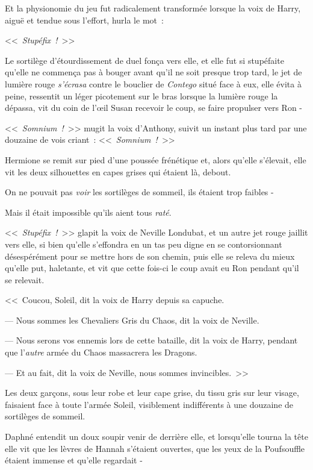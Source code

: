 Et la physionomie du jeu fut radicalement transformée lorsque la voix de Harry, aiguë et tendue sous l'effort, hurla le mot~:

<<~\emph{Stupéfix~!}~>>

Le sortilège d'étourdissement de duel fonça vers elle, et elle fut si stupéfaite qu'elle ne commença pas à bouger avant qu'il ne soit presque trop tard, le jet de lumière rouge \emph{s'écrasa} contre le bouclier de \emph{Contego} situé face à eux, elle évita à peine, ressentit un léger picotement sur le bras lorsque la lumière rouge la dépassa, vit du coin de l'œil Susan recevoir le coup, se faire propulser vers Ron -

<<~\emph{Somnium~!}~>> mugit la voix d'Anthony, suivit un instant plus tard par une douzaine de vois criant~: <<~\emph{Somnium~!}~>>

Hermione se remit sur pied d'une poussée frénétique et, alors qu'elle s'élevait, elle vit les deux silhouettes en capes grises qui étaient là, debout.

On ne pouvait pas \emph{voir} les sortilèges de sommeil, ils étaient trop faibles -

Mais il était impossible qu'ils aient tous \emph{raté}.

<<~\emph{Stupéfix~!}~>> glapit la voix de Neville Londubat, et un autre jet rouge jaillit vers elle, si bien qu'elle s'effondra en un tas peu digne en se contorsionnant désespérément pour se mettre hors de son chemin, puis elle se releva du mieux qu'elle put, haletante, et vit que cette fois-ci le coup avait eu Ron pendant qu'il se relevait.

<<~Coucou, Soleil, dit la voix de Harry depuis sa capuche.

--- Nous sommes les Chevaliers Gris du Chaos, dit la voix de Neville.

--- Nous serons vos ennemis lors de cette bataille, dit la voix de Harry, pendant que l'\emph{autre} armée du Chaos massacrera les Dragons.

--- Et au fait, dit la voix de Neville, nous sommes invincibles.~>>

\later

Les deux garçons, sous leur robe et leur cape grise, du tissu gris sur leur visage, faisaient face à toute l'armée Soleil, visiblement indifférents à une douzaine de sortilèges de sommeil.

Daphné entendit un doux soupir venir de derrière elle, et lorsqu'elle tourna la tête elle vit que les lèvres de Hannah s'étaient ouvertes, que les yeux de la Poufsouffle étaient immense et qu'elle regardait -


